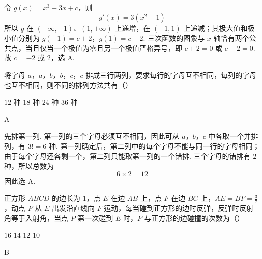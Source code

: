 \begin{solution}
令 \(g(x)=x^3-3x+c\)，则
\[
g'(x)=3(x^2-1)
\]
所以 \(g\) 在 \((-\infty,-1)\)、\((1,+\infty)\) 上递增，在 \((-1,1)\) 上递减；其极大值和极小值分别为 \(g(-1)=c+2\)，\(g(1)=c-2\).
三次函数的图象与 \(x\) 轴恰有两个公共点，当且仅当一个极值为零且另一个极值严格异号，即
\(c+2=0\) 或 \(c-2=0\).
故 \(c=-2\) 或 \(2\)，选 A.
\end{solution}

\begin{problem}
将字母 \(a\)，\(a\)，\(b\)，\(b\)，\(c\)，\(c\) 排成三行两列，要求每行的字母互不相同，每列的字母也互不相同，则不同的排列方法共有（\quad）

\choices
    {\(12\) 种}
    {\(18\) 种}
    {\(24\) 种}
    {\(36\) 种}
\end{problem}

\begin{answer}
A
\end{answer}

\begin{solution}
先排第一列. 第一列的三个字母必须互不相同，因此可从 \(a\)，\(b\)，\(c\) 中各取一个并排列，有 \(3!=6\) 种. 第一列确定后，第二列中的每个字母不能与同一行的字母相同；由于每个字母还各剩一个，第二列只能取第一列的一个错排. 三个字母的错排有 \(2\) 种，所以总数为
\[
6\times2=12
\]
因此选 A.
\end{solution}

\begin{problem}
正方形 \(ABCD\) 的边长为 \(1\)，点 \(E\) 在边 \(AB\) 上，点 \(F\) 在边 \(BC\) 上，\(AE = BF = \frac{3}{7}\)，动点 \(P\) 从 \(E\) 出发沿直线向 \(F\) 运动，每当碰到正方形的边时反弹，反弹时反射角等于入射角，当点 \(P\) 第一次碰到 \(E\) 时，\(P\) 与正方形的边碰撞的次数为（\quad）

\choices
    {\(16\)}
    {\(14\)}
    {\(12\)}
    {\(10\)}
\end{problem}

\begin{answer}
B
\end{answer}

